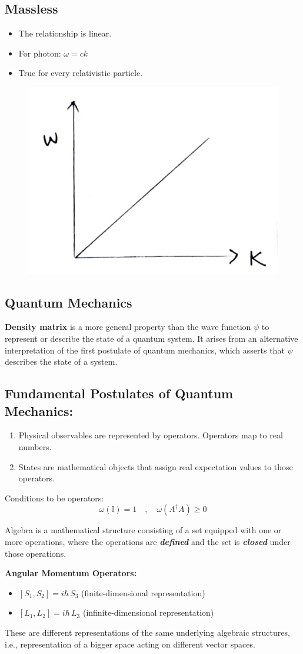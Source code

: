 \documentclass[14pt]{article} %
\begin{document}
\subsection*{Massless}
\begin{itemize}
    \item The relationship is linear.
    \item For photon: $\omega = ck$
    \item True for every relativistic particle.
\end{itemize}
\begin{figure}[H]
\centering
\includegraphics[width=0.45\linewidth]{L(-2)_2.jpg}
\caption*{}
\end{figure}
\vspace{-1cm}
\subsection{Quantum Mechanics}
\textbf{Density matrix} is a more general property than the wave function $\psi$ to represent or describe the state of a quantum system. It arises from an alternative interpretation of the first postulate of quantum mechanics, which asserts that $\psi$ describes the state of a system.
\subsection*{Fundamental Postulates of Quantum Mechanics:}
\begin{enumerate}
    \item Physical observables are represented by operators. Operators map to real numbers.
    \item States are mathematical objects that assign real expectation values to those operators.
\end{enumerate}
Conditions to be operators:
\[
\omega(\mathbb{I}) = 1 \quad , \quad \omega(A^\dagger A) \geq 0
\]
\begin{tcolorbox}[proofbox, title=\textbf{Question: What is algebra?}]
Algebra is a mathematical structure consisting of a set equipped with one or more operations, where the operations are \textbf{\textit{defined}} and the set is \textbf{\textit{closed}} under those operations.
\end{tcolorbox}
\textbf{Angular Momentum Operators:}
\begin{itemize}
    \item $[S_1, S_2] = i\hbar\, S_3$ \hfill (finite-dimensional representation)
    \item $[L_1, L_2] = i\hbar\, L_3$ \hfill (infinite-dimensional representation)
\end{itemize}
These are different representations of the same underlying algebraic structures, i.e., representation of a bigger space acting on different vector spaces.
\end{document}
